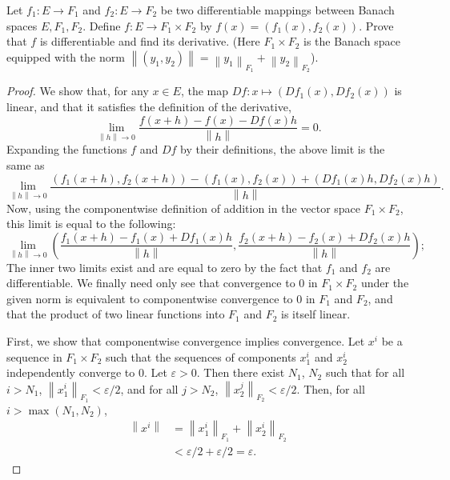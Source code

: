 \documentclass[12pt]{article}
\theoremstyle{definition}
\newenvironment{problem}[2][Problem]{\begin{trivlist}
\item[\hskip \labelsep {\bfseries #1}\hskip \labelsep {\bfseries #2.}]}{\end{trivlist}}
\begin{document}
\begin{problem}{2}
	Let $f_1: E \to F_1$ and $f_2: E \to F_2$ be two differentiable mappings between Banach spaces $E,F_1, F_2$. Define $f: E \to F_1 \times F_2$ by $f(x) = (f_1(x), f_2(x))$. Prove that $f$ is differentiable and find its derivative. (Here $F_1 \times F_2$ is the Banach space equipped with the norm $\left \lVert { (y_1, y_2) } \right \lVert  = \left \lVert { y_1 } \right \lVert _{F_1} + \left \lVert { y_2 } \right \lVert _{F_2}$).
\end{problem}
\begin{proof}
	We show that, for any $x \in E$, the map $Df: x \mapsto (Df_1(x), Df_2(x))$ is linear, and that it satisfies the definition of the derivative,
	\[\lim_{\left \lVert { h } \right \lVert \to 0} \frac{f(x + h) - f(x) - Df(x)h}{\left \lVert { h } \right \lVert } = 0.\]
	Expanding the functions $f$ and $Df$ by their definitions, the above limit is the same as
	\[\lim_{\left \lVert { h } \right \lVert  \to 0} \frac{(f_1(x+h),f_2(x+h)) - (f_1(x),f_2(x)) + (Df_1(x)h, Df_2(x)h) }{\left \lVert { h } \right \lVert }.\]
	Now, using the componentwise definition of addition in the vector space $F_1 \times F_2$, this limit is equal to the following:
	\[\lim_{\left \lVert { h } \right \lVert \to 0} \left( \frac{f_1(x+h) - f_1(x) + Df_1(x)h}{\left \lVert { h } \right \lVert}, \frac{f_2(x+h) - f_2(x) + Df_2(x)h}{\left \lVert { h } \right \lVert } \right);\]
	The inner two limits exist and are equal to zero by the fact that $f_1$ and $f_2$ are differentiable. We finally need only see that convergence to $0$ in $F_1 \times F_2$ under the given norm is equivalent to componentwise convergence to $0$ in $F_1$ and $F_2$, and that the product of two linear functions into $F_1$ and $F_2$ is itself linear.
	\par First, we show that componentwise convergence implies convergence. Let $x^i$ be a sequence in $F_1 \times F_2$ such that the sequences of components $x^i_1$ and $x^i_2$ independently converge to $0$. Let $\varepsilon > 0$. Then there exist $N_1$, $N_2$ such that for all $i > N_1$, $\left \lVert { x^i_1 } \right \lVert_{F_1} < \varepsilon/2 $, and for all $j > N_2$, $\left \lVert { x^j_2 } \right \lVert _{F_2} < \varepsilon/2$. Then, for all $i > \max(N_1, N_2)$,
	\begin{align*}\left \lVert { x^i } \right \lVert &= \left \lVert { x^i_1 } \right \lVert_{F_1} + \left \lVert { x^i_2 } \right \lVert_{F_2}\\
		&< \varepsilon/2 + \varepsilon/2 = \varepsilon.
	\end{align*}

\end{proof}
\end{document}
